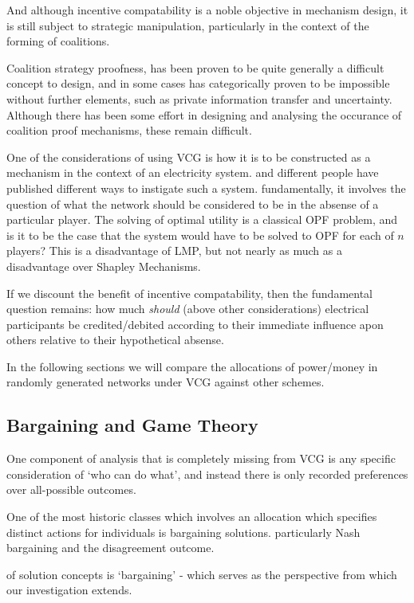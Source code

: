 And although incentive compatability is a noble objective in mechanism design, it is still subject to strategic manipulation, particularly in the context of the forming of coalitions.

Coalition strategy proofness, has been proven to be quite generally a difficult concept to design, and in some cases has categorically proven to be impossible \cite{10.2307/2297048} without further elements, such as private information transfer and uncertainty.
Although there has been some effort in designing and analysing the occurance of coalition proof mechanisms, these remain difficult.

One of the considerations of using VCG is how it is to be constructed as a mechanism in the context of an electricity system.
and different people have published different ways to instigate such a system.
fundamentally, it involves the question of what the network should be considered to be in the absense of a particular player.
The solving of optimal utility is a classical OPF problem, and is it to be the case that the system would have to be solved to OPF for each of $n$ players?
This is a disadvantage of LMP, but not nearly as much as a disadvantage over Shapley Mechanisms.

If we discount the benefit of incentive compatability, then the fundamental question remains: how much \textit{should} (above other considerations) electrical participants be credited/debited according to their immediate influence apon others relative to their hypothetical absense.

In the following sections we will compare the allocations of power/money in randomly generated networks under VCG against other schemes.


\subsection{Bargaining and Game Theory}

One component of analysis that is completely missing from VCG is any specific consideration of `who can do what', and instead there is only recorded preferences over all-possible outcomes.

One of the most historic classes which involves an allocation which specifies distinct actions for individuals is bargaining solutions.
particularly Nash bargaining and the disagreement outcome.

of solution concepts is `bargaining' - which serves as the perspective from which our investigation extends.\\

